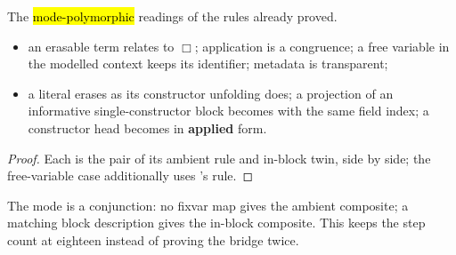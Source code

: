\begin{lemma}
\label{lem:ErasesLBMode-box}
\leanok
{}
 The \hl{mode-polymorphic} readings of the rules already proved.
\begin{itemize}
\item an erasable term relates to $\Box$; application is a congruence; a free variable in the modelled
context keeps its identifier; metadata is transparent;
\item a literal erases as its constructor unfolding does; a projection of an informative
single-constructor block becomes  with the same field index; a constructor head becomes
 in \textbf{applied} form.
\end{itemize}
\end{lemma}
\begin{proof}
\leanok
{}
 Each is the pair of its ambient rule and in-block twin, side by side; the free-variable case
additionally uses 's  rule.
\end{proof}

\begin{remark}
 The mode is a conjunction: no fixvar map gives the ambient composite; a matching block
description gives the in-block composite. This keeps the step count at eighteen instead of proving the
bridge twice.
\end{remark}

